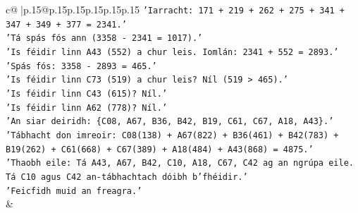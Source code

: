 \documentclass{article}
\begin{document}
{\begin{supertabular}{c@{$\;$}|p{.15\linewidth}@{}p{.15\linewidth}p{.15\linewidth}p{.15\linewidth}p{.15\linewidth}p{.15\linewidth}}
{{{\texttt{'Iarracht: 171 + 219 + 262 + 275 + 341 + 347 + 349 + 377 = 2341.'} \\
\texttt{'Tá spás fós ann (3358 {-} 2341 = 1017).'} \\
\texttt{'Is féidir linn A43 (552) a chur leis. Iomlán: 2341 + 552 = 2893.'} \\
\texttt{'Spás fós: 3358 {-} 2893 = 465.'} \\
\texttt{'Is féidir linn C73 (519) a chur leis? Níl (519 > 465).'} \\
\texttt{'Is féidir linn C43 (615)? Níl.'} \\
\texttt{'Is féidir linn A62 (778)? Níl.'} \\
\texttt{'An siar deiridh: \{C08, A67, B36, B42, B19, C61, C67, A18, A43\}.'} \\
\texttt{'Tábhacht don imreoir: C08(138) + A67(822) + B36(461) + B42(783) + B19(262) + C61(668) + C67(389) + A18(484) + A43(868) = 4875.'} \\
\texttt{'Thaobh eile: Tá A43, A67, B42, C10, A18, C67, C42 ag an ngrúpa eile. Tá C10 agus C42 an{-}tábhachtach dóibh b'fhéidir.'} \\
\texttt{'Feicfidh muid an freagra.'} \\
            }
        }
    }
    & \\ \\


\end{supertabular}}
\end{document}
